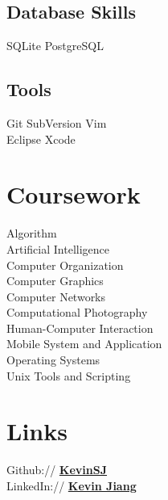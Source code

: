 \documentclass[]{deedy-resume-openfont}
\begin{document}
\begin{minipage}[t]{0.32\textwidth}
\subsection{Database Skills}
SQLite \textbullet{}PostgreSQL
\sectionsep

\subsection{Tools}
Git \textbullet{} SubVersion  \textbullet{} Vim \\
Eclipse \textbullet{} Xcode 
\sectionsep


\section{Coursework}
Algorithm			\\
Artificial Intelligence  \\
Computer Organization	\\
Computer Graphics	\\
Computer Networks	\\
Computational Photography \\
Human-Computer Interaction \\
Mobile System and Application \\
Operating Systems \\
Unix Tools and Scripting \\
\sectionsep


\section{Links} 
Github:// \href{https://github.com/kevinsj}{\bf KevinSJ} \\
LinkedIn://  \href{https://www.linkedin.com/in/kevsj}{\bf Kevin Jiang} \\
\sectionsep

%
%

\end{minipage} 
\hfill
\end{document}
